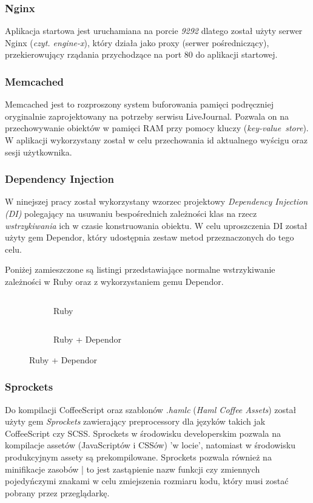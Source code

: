 \documentclass[11pt,a4paper, twoside]{article}
\begin{document}
\subsubsection{Nginx}
Aplikacja startowa jest uruchamiana na porcie \emph{9292} dlatego został użyty serwer Nginx (\emph{czyt. engine-x}), który działa jako proxy (serwer pośredniczący), przekierowujący rządania przychodzące na port 80 do aplikacji startowej.
\subsubsection{Memcached}
Memcached jest to rozproszony system buforowania pamięci podręczniej oryginalnie zaprojektowany na potrzeby serwisu  LiveJournal. Pozwala on na przechowywanie obiektów w pamięci RAM przy pomocy kluczy \mbox{(\emph{key-value store})}. W aplikacji wykorzystany został w celu przechowania id aktualnego wyścigu oraz sesji użytkownika.
\subsubsection{Dependency Injection}
W ninejszej pracy został wykorzystany wzorzec projektowy \emph{Dependency Injection (DI)} polegający na usuwaniu bespośrednich zależności klas na rzecz \emph{wstrzykiwania} ich w czasie konstruowania obiektu. W celu uproszczenia  DI został użyty gem Dependor, który udostępnia zestaw metod przeznaczonych do tego celu.

Poniżej zamieszczone są listingi przedstawiające normalne wstrzykiwanie zależności w Ruby oraz z wykorzystaniem gemu Dependor.
\newline


\begin{figure}[H]
\centering
\begin{subfigure}[t]{0.45\textwidth}
\caption{Ruby}
\begin{listing}[H]
\inputminted[linenos=true]{ruby}{./src/di_ruby.rb}
\end{listing}
\end{subfigure}
\begin{subfigure}[t]{0.45\textwidth}
\caption{Ruby + Dependor}
\begin{listing}[H]
\inputminted{ruby}{./src/di_dependor.rb}
\end{listing}
\end{subfigure}
\end{figure}
\subsubsection{Sprockets}
Do kompilacji CoffeeScript oraz szablonów \emph{.hamlc} (\emph{Haml Coffee Assets}) został użyty gem \emph{Sprockets} zawierający preprocessory dla języków takich jak CoffeeScript czy SCSS. Sprockets w środowisku developerskim pozwala na kompilacje assetów (JavaScriptów i CSSów) 'w locie', natomiast w środowisku produkcyjnym assety są prekompilowane. Sprockets pozwala również na minifikacje zasobów | to jest zastąpienie nazw funkcji czy zmiennych pojedyńczymi znakami w celu zmiejszenia rozmiaru kodu, który musi zostać pobrany przez przeglądarkę. 
\end{document}
